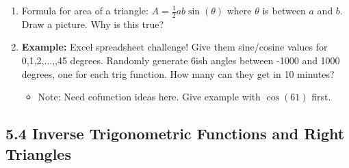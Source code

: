 \documentclass{article}
\begin{document}
\begin{enumerate}
\item Formula for area of a triangle: $A=\frac{1}{2}ab\sin(\theta)$ where $\theta$ is between $a$ and $b$. Draw a picture. Why is this true?


\item {\bf Example:} Excel spreadsheet challenge! Give them sine/cosine values for 0,1,2,...,,45 degrees. Randomly generate 6ish angles between -1000 and 1000 degrees, one for each trig function. How many can they get in 10 minutes?
\begin{itemize}
\item Note: Need cofunction ideas here. Give example with $\cos(61)$ first.
\end{itemize}

\end{enumerate}

\subsection{5.4 Inverse Trigonometric Functions and Right Triangles}
\end{document}
